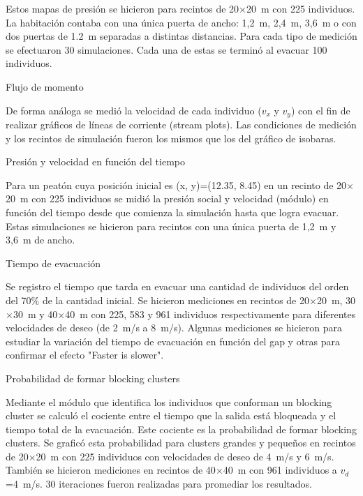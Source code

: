 
Estos mapas de presión se hicieron para recintos de 20$\times$20~m con 225 individuos. La habitación contaba con una única puerta de ancho: 1,2~m, 2,4~m, 3,6~m o con dos puertas de 1.2~m separadas a distintas distancias. Para cada tipo de medición se efectuaron 30 simulaciones. Cada una de estas se terminó al evacuar 100 individuos. 

{\Large Flujo de momento}

De forma análoga se medió la velocidad de cada individuo ($v_x$ y $v_y$) con el fin de realizar gráficos de líneas de corriente (stream plots). Las condiciones de medición y los recintos de simulación fueron los mismos que los del gráfico de isobaras. 

{\Large Presión y velocidad en función del tiempo}

Para un peatón cuya posición inicial es (x, y)=(12.35, 8.45) en un recinto de 20$\times$20~m con 225 individuos se midió la presión social y velocidad (módulo) en función del tiempo desde que comienza la simulación hasta que logra evacuar. Estas simulaciones se hicieron para recintos con una única puerta de 1,2~m y 3,6~m de ancho. 

{\Large Tiempo de evacuación}

Se registro el tiempo que tarda en evacuar una cantidad de individuos del orden del 70\% de la cantidad inicial. Se hicieron mediciones en recintos de 20$\times$20~m, 30$\times$30~m y 40$\times$40~m con 225, 583 y 961 individuos respectivamente para diferentes velocidades de deseo (de 2~m/s a 8~m/s). Algunas mediciones se hicieron para estudiar la variación del tiempo de evacuación en función del gap y otras para confirmar el efecto "Faster is slower". 

{\Large Probabilidad de formar blocking clusters}

Mediante el módulo que identifica los individuos que conforman un blocking cluster se calculó el cociente entre el tiempo que la salida está bloqueada y el tiempo total de la evacuación. Este cociente es la probabilidad de formar blocking clusters. Se graficó esta probabilidad para clusters grandes y pequeños en recintos de 20$\times$20~m con 225 individuos con velocidades de deseo de 4~m/s y 6~m/s. También se hicieron mediciones en recintos de 40$\times$40~m con 961 individuos a $v_d$=4~m/s. 30 iteraciones fueron realizadas para promediar los resultados. 


